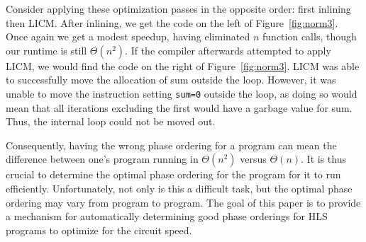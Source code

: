 Consider applying these optimization passes in the opposite order: first inlining then LICM. After inlining, we get the code on the left of Figure~\ref{fig:norm3}. Once again we get a modest speedup, having eliminated $n$ function calls, though our runtime is still $\Theta(n^2)$. If the compiler afterwards attempted to apply LICM, we would find the code on the right of Figure~\ref{fig:norm3}. LICM was able to successfully move the allocation of sum outside the loop. However, it was unable to move the instruction setting \verb|sum=0| outside the loop, as doing so would mean that all iterations excluding the first would have a garbage value for sum. Thus, the internal loop could not be moved out.

Consequently, having the wrong phase ordering for a program can mean the difference between one's program running in $\Theta(n^2)$ versus $\Theta(n)$. It is thus crucial to determine the optimal phase ordering for the program for it to run efficiently. Unfortunately, not only is this a difficult task, but the optimal phase ordering may vary from program to program.
The goal of this paper is to provide a mechanism for automatically determining good phase orderings for HLS programs to optimize for the circuit speed. 

